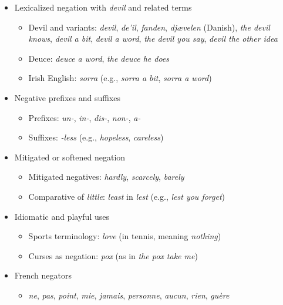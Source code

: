 \begin{itemize}[leftmargin=*]
    \item {Lexicalized negation with \textit{devil} and related terms}
    \begin{itemize}
        \item Devil and variants: \textit{devil}, \textit{de’il}, \textit{fanden}, \textit{djævelen} (Danish), \textit{the devil knows}, \textit{devil a bit}, \textit{devil a word}, \textit{the devil you say}, \textit{devil the other idea}
        \item Deuce: \textit{deuce a word}, \textit{the deuce he does}
        \item Irish English: \textit{sorra} (e.g., \textit{sorra a bit}, \textit{sorra a word})
    \end{itemize}

    \item {Negative prefixes and suffixes}
    \begin{itemize}
        \item Prefixes: \textit{un-}, \textit{in-}, \textit{dis-}, \textit{non-}, \textit{a-}
        \item Suffixes: \textit{-less} (e.g., \textit{hopeless}, \textit{careless})
    \end{itemize}

    \item {Mitigated or softened negation}
    \begin{itemize}
        \item Mitigated negatives: \textit{hardly}, \textit{scarcely}, \textit{barely}
        \item Comparative of \textit{little}: \textit{least} in \textit{lest} (e.g., \textit{lest you forget})
    \end{itemize}

    \item {Idiomatic and playful uses}
    \begin{itemize}
        \item Sports terminology: \textit{love} (in tennis, meaning \textit{nothing})
        \item Curses as negation: \textit{pox} (as in \textit{the pox take me})
    \end{itemize}

    \item {French negators}
    \begin{itemize}
        \item \textit{ne}, \textit{pas}, \textit{point}, \textit{mie}, \textit{jamais}, \textit{personne}, \textit{aucun}, \textit{rien}, \textit{guère}
    \end{itemize}


\end{itemize}
